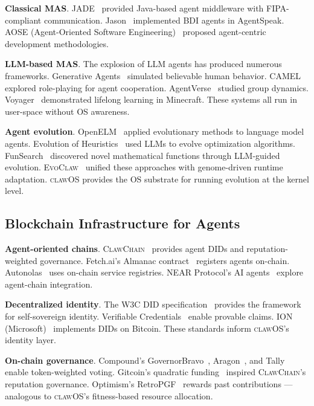 \documentclass{article}
\newcommand{\clawos}{\textsc{clawOS}}
\newcommand{\evoclaw}{\textsc{EvoClaw}}
\newcommand{\clawchain}{\textsc{ClawChain}}
\begin{document}
\textbf{Classical MAS}. JADE~\cite{bellifemine2007developing} provided Java-based agent middleware with FIPA-compliant communication. Jason~\cite{bordini2007programming} implemented BDI agents in AgentSpeak. AOSE (Agent-Oriented Software Engineering)~\cite{jennings2000agent} proposed agent-centric development methodologies.

\textbf{LLM-based MAS}. The explosion of LLM agents has produced numerous frameworks. Generative Agents~\cite{park2023generative} simulated believable human behavior. CAMEL~\cite{li2023camel} explored role-playing for agent cooperation. AgentVerse~\cite{chen2024agentverse} studied group dynamics. Voyager~\cite{wang2023voyager} demonstrated lifelong learning in Minecraft. These systems all run in user-space without OS awareness.

\textbf{Agent evolution}. OpenELM~\cite{openelm2024} applied evolutionary methods to language model agents. Evolution of Heuristics~\cite{liu2024evolution} used LLMs to evolve optimization algorithms. FunSearch~\cite{romera2024funsearch} discovered novel mathematical functions through LLM-guided evolution. \evoclaw{}~\cite{chen2026evoclaw} unified these approaches with genome-driven runtime adaptation. \clawos{} provides the OS substrate for running evolution at the kernel level.

\subsection{Blockchain Infrastructure for Agents}

\textbf{Agent-oriented chains}. \clawchain{}~\cite{chen2026clawchain} provides agent DIDs and reputation-weighted governance. Fetch.ai's Almanac contract~\cite{fetchai2024} registers agents on-chain. Autonolas~\cite{autonolas2024} uses on-chain service registries. NEAR Protocol's AI agents~\cite{near2025agents} explore agent-chain integration.

\textbf{Decentralized identity}. The W3C DID specification~\cite{w3c_did_2022} provides the framework for self-sovereign identity. Verifiable Credentials~\cite{w3c_vc_2022} enable provable claims. ION (Microsoft)~\cite{sidetree2024} implements DIDs on Bitcoin. These standards inform \clawos{}'s identity layer.

\textbf{On-chain governance}. Compound's GovernorBravo~\cite{compound2024}, Aragon~\cite{aragon2024}, and Tally~\cite{tally2024} enable token-weighted voting. Gitcoin's quadratic funding~\cite{buterin2019quadratic} inspired \clawchain{}'s reputation governance. Optimism's RetroPGF~\cite{optimism2024retropgf} rewards past contributions — analogous to \clawos{}'s fitness-based resource allocation.
\end{document}

